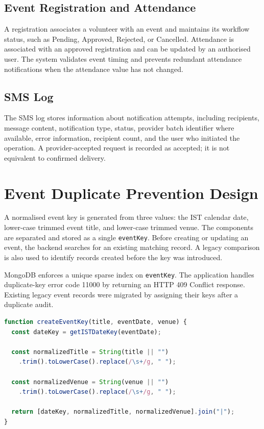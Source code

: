 \documentclass[12pt,a4paper,oneside]{report}
\begin{document}
\subsection{Event Registration and Attendance}
A registration associates a volunteer with an event and maintains its workflow status, such as Pending, Approved, Rejected, or Cancelled. Attendance is associated with an approved registration and can be updated by an authorised user. The system validates event timing and prevents redundant attendance notifications when the attendance value has not changed.

\subsection{SMS Log}
The SMS log stores information about notification attempts, including recipients, message content, notification type, status, provider batch identifier where available, error information, recipient count, and the user who initiated the operation. A provider-accepted request is recorded as accepted; it is not equivalent to confirmed delivery.

\section{Event Duplicate Prevention Design}
A normalised event key is generated from three values: the IST calendar date, lower-case trimmed event title, and lower-case trimmed venue. The components are separated and stored as a single \texttt{eventKey}. Before creating or updating an event, the backend searches for an existing matching record. A legacy comparison is also used to identify records created before the key was introduced.

MongoDB enforces a unique sparse index on \texttt{eventKey}. The application handles duplicate-key error code 11000 by returning an HTTP 409 Conflict response. Existing legacy event records were migrated by assigning their keys after a duplicate audit.

\begin{lstlisting}[language=JavaScript,caption={Illustrative event key generation}]
function createEventKey(title, eventDate, venue) {
  const dateKey = getISTDateKey(eventDate);

  const normalizedTitle = String(title || "")
    .trim().toLowerCase().replace(/\s+/g, " ");

  const normalizedVenue = String(venue || "")
    .trim().toLowerCase().replace(/\s+/g, " ");

  return [dateKey, normalizedTitle, normalizedVenue].join("|");
}
\end{lstlisting}
\end{document}
